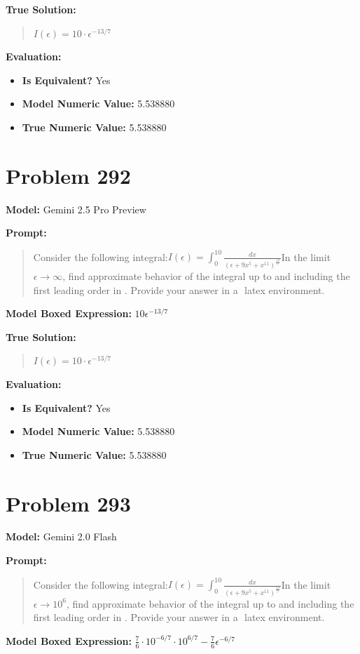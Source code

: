 \documentclass{article}
\begin{document}
{\textbf{True Solution:}
\begin{quote}
$I(\epsilon) = 10\cdot\epsilon^{-13/7}$
\end{quote}

\textbf{Evaluation:}
\begin{itemize}
\item \textbf{Is Equivalent?} Yes
\item \textbf{Model Numeric Value:} 5.538880
\item \textbf{True Numeric Value:} 5.538880
\end{itemize}
\vspace{1cm}
\section*{Problem 292}
\textbf{Model:} Gemini 2.5 Pro Preview

\textbf{Prompt:}
\begin{quote}
Consider the following integral:$I(\epsilon) = \int_0^{10} \frac{dx}{(\epsilon + 9x^5 + x^{11})^\frac{13}{7}}$In the limit$\epsilon \to \infty$, find approximate behavior of the integral up to and including the first leading order in \epsilon. Provide your answer in a $\boxed{}$ latex environment.
\end{quote}
\textbf{Model Boxed Expression:} $10\epsilon^{-13/7}$

\textbf{True Solution:}
\begin{quote}
$I(\epsilon) = 10\cdot\epsilon^{-13/7}$
\end{quote}

\textbf{Evaluation:}
\begin{itemize}
\item \textbf{Is Equivalent?} Yes
\item \textbf{Model Numeric Value:} 5.538880
\item \textbf{True Numeric Value:} 5.538880
\end{itemize}
\vspace{1cm}
\section*{Problem 293}
\textbf{Model:} Gemini 2.0 Flash

\textbf{Prompt:}
\begin{quote}
Consider the following integral:$I(\epsilon) = \int_0^{10} \frac{dx}{(\epsilon + 9x^5 + x^{11})^\frac{13}{7}}$In the limit$\epsilon \to 10^6$, find approximate behavior of the integral up to and including the first leading order in \epsilon. Provide your answer in a $\boxed{}$ latex environment.
\end{quote}
\textbf{Model Boxed Expression:} $\frac{7}{6} \cdot 10^{-6/7} \cdot 10^{6/7} - \frac{7}{6} \epsilon^{-6/7}$

}
\end{document}
